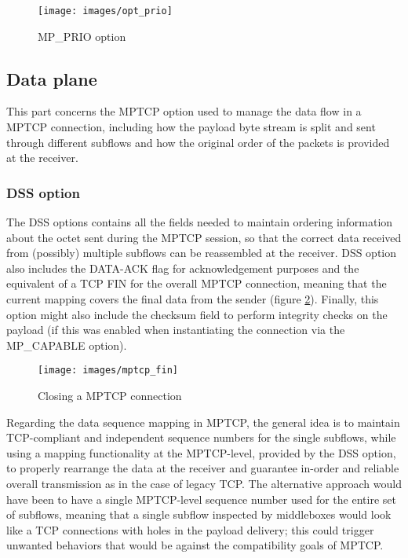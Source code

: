 \begin{figure}[!htb]
\centering
\texttt{[image: images/opt\_prio]}
\caption{MP\_PRIO option}
\label{fig:opt_prio}
\end{figure}

\subsection{Data plane}
\label{dataplane}
This part concerns the MPTCP option used to manage the data flow in a MPTCP connection, including how the payload byte stream is split and sent through different subflows and how the original order of the packets is provided at the receiver.

\subsubsection{DSS option}
\label{dss}
The DSS options contains all the fields needed to maintain ordering information about the octet sent during the MPTCP session, so that the correct data received from (possibly) multiple subflows can be reassembled at the receiver. DSS option also includes the DATA-ACK flag for acknowledgement purposes and the equivalent of a TCP FIN for the overall MPTCP connection, meaning that the current mapping covers the final data from the sender (figure \ref{fig:mptcp_fin}). Finally, this option might also include the checksum field to perform integrity checks on the payload (if this was enabled when instantiating the connection via the MP\_CAPABLE option).

\begin{figure}[!htb]
\centering
\texttt{[image: images/mptcp\_fin]}
\caption{Closing a MPTCP connection}
\label{fig:mptcp_fin}
\end{figure}

Regarding the data sequence mapping in MPTCP, the general idea is to maintain TCP-compliant and independent sequence numbers for the single subflows, while using a mapping functionality at the MPTCP-level, provided by the DSS option, to properly rearrange the data at the receiver and guarantee in-order and reliable overall transmission as in the case of legacy TCP. The alternative approach would have been to have a single MPTCP-level sequence number used for the entire set of subflows, meaning that a single subflow inspected by middleboxes would look like a TCP connections with holes in the payload delivery; this could trigger unwanted behaviors that would be against the compatibility goals of MPTCP.

